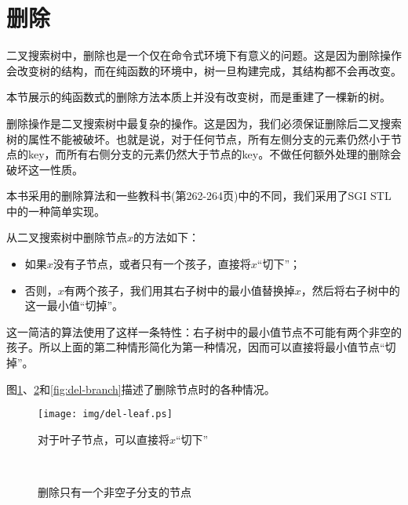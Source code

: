 \documentclass[b5paper]{ctexart}
\begin{document}
\section{删除}
二叉搜索树中，删除也是一个仅在命令式环境下有意义的问题。这是因为删除操作会改变树的结构，而在纯函数的环境中，树一旦构建完成，其结构都不会再改变。

本节展示的纯函数式的删除方法本质上并没有改变树，而是重建了一棵新的树。

删除操作是二叉搜索树中最复杂的操作。这是因为，我们必须保证删除后二叉搜索树的属性不能被破坏。也就是说，对于任何节点，所有左侧分支的元素仍然小于节点的key，而所有右侧分支的元素仍然大于节点的key。不做任何额外处理的删除会破坏这一性质。

本书采用的删除算法和一些教科书(\cite{CLRS}第262-264页)中的不同，我们采用了SGI STL中的一种简单实现\cite{sgi-stl}。

从二叉搜索树中删除节点$x$的方法如下：
\begin{itemize}
\item 如果$x$没有子节点，或者只有一个孩子，直接将$x$“切下”；
\item 否则，$x$有两个孩子，我们用其右子树中的最小值替换掉$x$，然后将右子树中的这一最小值“切掉”。
\end{itemize}

这一简洁的算法使用了这样一条特性：右子树中的最小值节点不可能有两个非空的孩子。所以上面的第二种情形简化为第一种情况，因而可以直接将最小值节点“切掉”。

图\ref{fig:del-leaf}、\ref{fig:del-1child}和\ref{fig:del-branch}描述了删除节点时的各种情况。

\begin{figure}[htbp]
  \centering
  \texttt{[image: img/del-leaf.ps]}
  \caption{对于叶子节点，可以直接将$x$“切下”} \label{fig:del-leaf}
\end{figure}

\begin{figure}[htbp]
  \centering
   \\
  \caption{删除只有一个非空子分支的节点}
  \label{fig:del-1child}
\end{figure}
\end{document}
